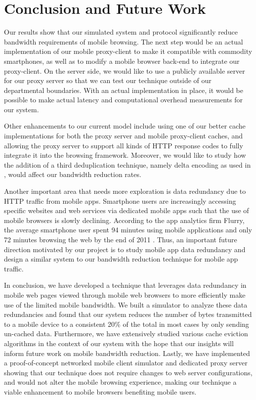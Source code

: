 \section{Conclusion and Future Work}
\label{sec:conclusion}
Our results show that our simulated system and protocol significantly reduce bandwidth requirements of mobile browsing. The next step would be an actual implementation of our mobile proxy-client to make it compatible with commodity smartphones, as well as to modify a mobile browser back-end to integrate our proxy-client. On the server side, we would like to use a publicly available server for our proxy server so that we can test our technique outside of our departmental boundaries. With an actual implementation in place, it would be possible to make actual latency and computational overhead measurements for our system.

Other enhancements to our current model include using one of our better cache implementations for both the proxy server and mobile proxy-client caches, and allowing the proxy server to support all kinds of HTTP response codes to fully integrate it into the browsing framework. Moreover, we would like to study how the addition of a third deduplication technique, namely delta encoding as used in \cite{delta}, would affect our bandwidth reduction rates.

Another important area that needs more exploration is data redundancy due to HTTP traffic from mobile apps. Smartphone users are increasingly accessing specific websites and web services via dedicated mobile apps such that the use of mobile browsers is slowly declining. According to the app analytics firm Flurry, the average smartphone user spent 94 minutes using mobile applications and only 72 minutes browsing the web by the end of 2011 \cite{flurry}. Thus, an important future direction motivated by our project is to study mobile app data redundancy and design a similar system to our bandwidth reduction technique for mobile app traffic.

In conclusion, we have developed a technique that leverages data redundancy in mobile web pages viewed through mobile web browsers to more efficiently make use of the limited mobile bandwidth. We built a simulator to analyze these data redundancies and found that our system reduces the number of bytes transmitted to a mobile device to a consistent 20\% of the total in most cases by only sending un-cached data. 
Furthermore, we have extensively studied various cache eviction algorithms in the context of our system with the hope that our insights will inform future work on mobile bandwidth reduction.
Lastly, we have implemented a proof-of-concept networked mobile client simulator and dedicated proxy server showing that our technique does not require changes to web server configurations, and would not alter the mobile browsing experience, making our technique a viable enhancement to mobile browsers benefiting mobile users.



